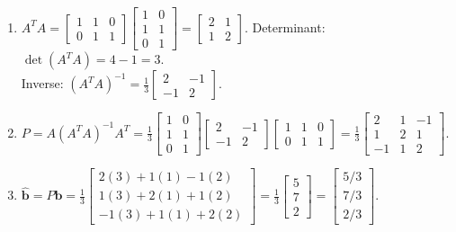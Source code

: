\begin{enumerate}[label=(\alph*)]
    \item $A^T A = \begin{bmatrix} 1 & 1 & 0 \\ 0 & 1 & 1 \end{bmatrix} \begin{bmatrix} 1 & 0 \\ 1 & 1 \\ 0 & 1 \end{bmatrix} = \begin{bmatrix} 2 & 1 \\ 1 & 2 \end{bmatrix}$.
    Determinant: $\det(A^T A) = 4 - 1 = 3$. \\
    Inverse: $(A^T A)^{-1} = \frac{1}{3} \begin{bmatrix} 2 & -1 \\ -1 & 2 \end{bmatrix}$.
    \item $P = A (A^T A)^{-1} A^T = \frac{1}{3} \begin{bmatrix} 1 & 0 \\ 1 & 1 \\ 0 & 1 \end{bmatrix} \begin{bmatrix} 2 & -1 \\ -1 & 2 \end{bmatrix} \begin{bmatrix} 1 & 1 & 0 \\ 0 & 1 & 1 \end{bmatrix} = \frac{1}{3} \begin{bmatrix} 2 & 1 & -1 \\ 1 & 2 & 1 \\ -1 & 1 & 2 \end{bmatrix}$.
    \item $\hat{\mathbf{b}} = P\mathbf{b} = \frac{1}{3} \begin{bmatrix} 2(3) + 1(1) - 1(2) \\ 1(3) + 2(1) + 1(2) \\ -1(3) + 1(1) + 2(2) \end{bmatrix} = \frac{1}{3} \begin{bmatrix} 5 \\ 7 \\ 2 \end{bmatrix} = \begin{bmatrix} 5/3 \\ 7/3 \\ 2/3 \end{bmatrix}$.

\end{enumerate}
